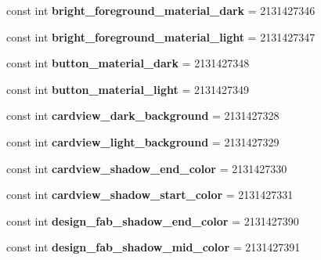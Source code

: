 \begin{DoxyCompactItemize}
const int {\bfseries bright\+\_\+foreground\+\_\+material\+\_\+dark} = 2131427346
\item 
\mbox{\label{classXaria_1_1Resource_1_1Color_a7f6d0fa1220a21189bd6da999e96b1c3}} 
const int {\bfseries bright\+\_\+foreground\+\_\+material\+\_\+light} = 2131427347
\item 
\mbox{\label{classXaria_1_1Resource_1_1Color_aa54d0e949df47ec950971610e2e59a26}} 
const int {\bfseries button\+\_\+material\+\_\+dark} = 2131427348
\item 
\mbox{\label{classXaria_1_1Resource_1_1Color_a5e44ef39502be163853aba2e0db4d5b9}} 
const int {\bfseries button\+\_\+material\+\_\+light} = 2131427349
\item 
\mbox{\label{classXaria_1_1Resource_1_1Color_a8e2277fed93c5a9ac6b72effde251352}} 
const int {\bfseries cardview\+\_\+dark\+\_\+background} = 2131427328
\item 
\mbox{\label{classXaria_1_1Resource_1_1Color_a8e028cf63bb49e22102c0005cc6a6805}} 
const int {\bfseries cardview\+\_\+light\+\_\+background} = 2131427329
\item 
\mbox{\label{classXaria_1_1Resource_1_1Color_a061437140b48fff24d85532bf0af2983}} 
const int {\bfseries cardview\+\_\+shadow\+\_\+end\+\_\+color} = 2131427330
\item 
\mbox{\label{classXaria_1_1Resource_1_1Color_a3e3589bb742fdaf873b2622082335f4e}} 
const int {\bfseries cardview\+\_\+shadow\+\_\+start\+\_\+color} = 2131427331
\item 
\mbox{\label{classXaria_1_1Resource_1_1Color_a7a6b185ff1f0c4a83a941ce2a86c9cf4}} 
const int {\bfseries design\+\_\+fab\+\_\+shadow\+\_\+end\+\_\+color} = 2131427390
\item 
\mbox{\label{classXaria_1_1Resource_1_1Color_a212728e43584e289d507d37f5ff04653}} 
const int {\bfseries design\+\_\+fab\+\_\+shadow\+\_\+mid\+\_\+color} = 2131427391

\end{DoxyCompactItemize}
